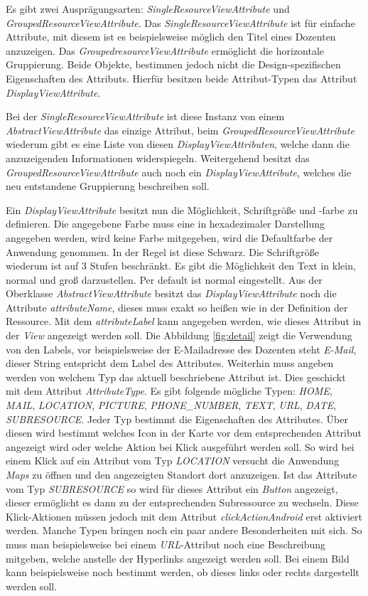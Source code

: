Es gibt zwei Ausprägungsarten: \textit{SingleResourceViewAttribute} und \textit{GroupedResourceViewAttribute}.  Das \textit{SingleResourceViewAttribute} ist für einfache Attribute, mit diesem ist es beispielsweise möglich den Titel eines Dozenten anzuzeigen. Das \textit{GroupedresourceViewAttribute} ermöglicht die horizontale Gruppierung. Beide Objekte, bestimmen jedoch nicht die Design-spezifischen Eigenschaften des Attributs. Hierfür besitzen beide Attribut-Typen das Attribut \textit{DisplayViewAttribute}.

Bei der \textit{SingleResourceViewAttribute} ist diese Instanz von einem \textit{AbstractViewAttribute} das einzige Attribut, beim \textit{GroupedResourceViewAttribute} wiederum gibt es eine Liste von diesen \textit{DisplayViewAttributen}, welche dann die anzuzeigenden Informationen widerspiegeln. Weitergehend besitzt das \textit{GroupedResourceViewAttribute} auch noch ein \textit{DisplayViewAttribute}, welches die neu entstandene Gruppierung beschreiben soll.

Ein \textit{DisplayViewAttribute} besitzt nun die Möglichkeit, Schriftgröße und -farbe zu definieren. Die angegebene Farbe muss eine in hexadezimaler Darstellung angegeben werden, wird keine Farbe mitgegeben, wird die Defaultfarbe der Anwendung genommen. In der Regel ist diese Schwarz.  Die Schriftgröße wiederum ist auf 3 Stufen beschränkt. Es gibt die Möglichkeit den Text in klein, normal und groß darzustellen. Per default ist normal eingestellt. Aus der Oberklasse \textit{AbstractViewAttribute} besitzt das \textit{DisplayViewAttribute} noch die Attribute \textit{attributeName}, dieses muss exakt so heißen wie in der Definition der Ressource.
Mit dem \textit{attributeLabel} kann angegeben werden, wie dieses Attribut in der \textit{View} angezeigt werden soll. Die Abbildung \ref{fig:detail} zeigt die Verwendung von den Labels, vor beispielsweise der E-Mailadresse des Dozenten steht \textit{E-Mail}, dieser String entspricht dem Label des Attributes. Weiterhin muss angeben werden von welchem Typ das aktuell beschriebene Attribut ist.
Dies geschickt mit dem Attribut \textit{AttributeType}. Es gibt folgende mögliche Typen: \textit{HOME}, \textit{MAIL}, \textit{LOCATION}, \textit{PICTURE}, \textit{PHONE\_NUMBER}, \textit{TEXT}, \textit{URL}, \textit{DATE}, \textit{SUBRESOURCE}. Jeder Typ bestimmt die Eigenschaften des Attributes. Über diesen wird bestimmt welches Icon in der Karte vor dem entsprechenden Attribut angezeigt wird oder welche Aktion bei Klick ausgeführt werden soll. So wird bei einem Klick auf ein Attribut vom Typ \textit{LOCATION} versucht die Anwendung \textit{Maps} zu öffnen und den angezeigten Standort dort anzuzeigen. Ist das Attribute vom Typ \textit{SUBRESOURCE} so wird für dieses Attribut ein \textit{Button} angezeigt, dieser ermöglicht es dann zu der entsprechenden Subressource zu wechseln. Diese Klick-Aktionen müssen jedoch mit dem Attribut \textit{clickActionAndroid} erst aktiviert werden.
Manche Typen bringen noch ein paar andere Besonderheiten mit sich. So muss man beispielsweise bei einem \textit{URL}-Attribut noch eine Beschreibung mitgeben, welche anstelle der Hyperlinks angezeigt werden soll. Bei einem Bild kann beispielsweise noch bestimmt werden, ob dieses links oder rechts dargestellt werden soll. 

